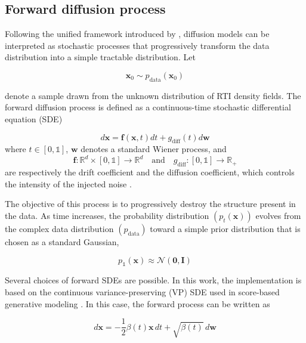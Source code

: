 
\subsection{Forward diffusion process}

Following the unified framework introduced by \citep{Song2021SDE}, diffusion models can be interpreted as stochastic processes that progressively transform the data distribution into a simple tractable distribution. Let

\begin{equation}
\mathbf{x}_0 \sim p_{\mathrm{data}}(\mathbf{x}_0)
\end{equation}


denote a sample drawn from the unknown distribution of RTI density fields. The forward diffusion process is defined as a continuous-time stochastic differential equation (SDE)

\begin{equation}
d\mathbf{x}
=
\mathbf{f}(\mathbf{x},t)dt
+
g_{\mathrm{diff}}(t)d\mathbf{w}
\end{equation}
where $t\in[0,\mathds{1}]$, $\mathbf{w}$ denotes a standard Wiener process, and
\[
\mathbf{f}:\mathbb{R}^{d}\times[0,\mathds{1}]\to\mathbb{R}^{d}
\quad\text{and}\quad
g_{\mathrm{diff}}:[0,\mathds{1}]\to\mathbb{R}_{+}
\]
are respectively the drift coefficient and the diffusion coefficient,
which controls the intensity of the injected noise \citep{Song2021SDE}.

The objective of this process is to progressively destroy the structure present in the data. As time increases, the probability distribution $(p_t(\mathbf{x}))$ evolves from the complex data distribution $(p_{\mathrm{data}})$ toward a simple prior distribution that is chosen as a standard Gaussian,

\begin{equation}
p_{\mathds{1}}(\mathbf{x})
\approx
\mathcal{N}(\mathbf{0},\mathbf{I})
\end{equation}

Several choices of forward SDEs are possible. In this work, the implementation is based on the continuous variance-preserving (VP) SDE used in score-based generative modeling \citep{Song2021SDE}. In this case, the forward process can be written as

\begin{equation}
d\mathbf{x}
=
-\frac{1}{2}\beta(t)\mathbf{x}\,dt
+
\sqrt{\beta(t)}\,d\mathbf{w}
\end{equation}

